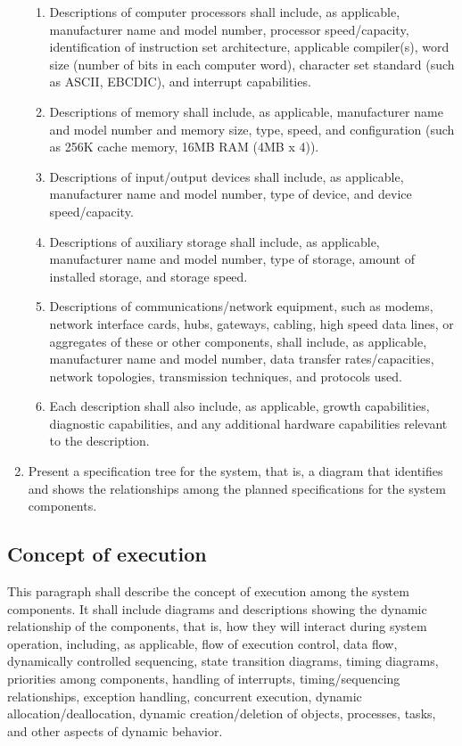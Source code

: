 \documentclass{fidata-report-template}
\begin{document}
\begin{enumerate}
  \begin{enumerate}
  \itemsep1pt\parskip0pt
  \item
    Descriptions of computer processors shall include, as applicable,
    manufacturer name and model number, processor speed/capacity,
    identification of instruction set architecture, applicable
    compiler(s), word size (number of bits in each computer word),
    character set standard (such as ASCII, EBCDIC), and interrupt
    capabilities.
  \item
    Descriptions of memory shall include, as applicable, manufacturer
    name and model number and memory size, type, speed, and
    configuration (such as 256K cache memory, 16MB RAM (4MB x 4)).
  \item
    Descriptions of input/output devices shall include, as applicable,
    manufacturer name and model number, type of device, and device
    speed/capacity.
  \item
    Descriptions of auxiliary storage shall include, as applicable,
    manufacturer name and model number, type of storage, amount of
    installed storage, and storage speed.
  \item
    Descriptions of communications/network equipment, such as modems,
    network interface cards, hubs, gateways, cabling, high speed data
    lines, or aggregates of these or other components, shall include, as
    applicable, manufacturer name and model number, data transfer
    rates/capacities, network topologies, transmission techniques, and
    protocols used.
  \item
    Each description shall also include, as applicable, growth
    capabilities, diagnostic capabilities, and any additional hardware
    capabilities relevant to the description.
  \end{enumerate}
\item
  Present a specification tree for the system, that is, a diagram that
  identifies and shows the relationships among the planned
  specifications for the system components.
\end{enumerate}

\subsection{Concept of execution}

This paragraph shall describe the concept of execution among the system
components. It shall include diagrams and descriptions showing the
dynamic relationship of the components, that is, how they will interact
during system operation, including, as applicable, flow of execution
control, data flow, dynamically controlled sequencing, state transition
diagrams, timing diagrams, priorities among components, handling of
interrupts, timing/sequencing relationships, exception handling,
concurrent execution, dynamic allocation/deallocation, dynamic
creation/deletion of objects, processes, tasks, and other aspects of
dynamic behavior.
\end{document}
